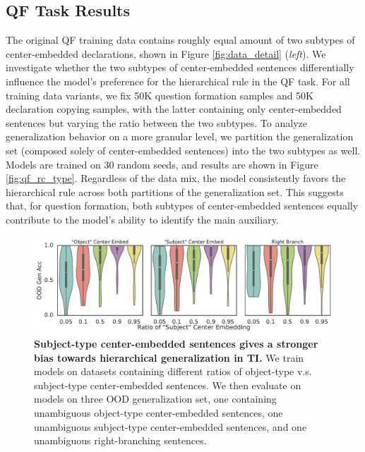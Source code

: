 \subsection{QF Task Results}
The original QF training data contains roughly equal amount of two subtypes of center-embedded declarations, shown in Figure \ref{fig:data_detail} (\textit{left}). We investigate whether the two subtypes of center-embedded sentences differentially influence the model's preference for the hierarchical rule in the QF task. For all training data variants, we fix 50K question formation samples and 50K declaration copying samples, with the latter containing only center-embedded sentences but varying the ratio between the two subtypes. To analyze generalization behavior on a more granular level, we partition the generalization set (composed solely of center-embedded sentences) into the two subtypes as well. Models are trained on 30 random seeds, and results are shown in Figure \ref{fig:qf_rc_type}. Regardless of the data mix, the model consistently favors the hierarchical rule across both partitions of the generalization set. This suggests that, for question formation, both subtypes of center-embedded sentences equally contribute to the model's ability to identify the main auxiliary.



\begin{figure}[h]
    \centering
    \includegraphics[width=0.9\linewidth]{figures/ti_rc_type.pdf}
    \caption{\textbf{Subject-type center-embedded sentences gives a stronger bias towards hierarchical generalization in TI.} We train models on datasets containing different ratios of object-type v.s. subject-type center-embedded sentences. We then evaluate on models on three OOD generalization set, one containing unambiguous object-type center-embedded sentences, one unambiguous subject-type center-embedded sentences, and one unambiguous right-branching sentences.}
    \label{fig:ti_rc_type}
\end{figure}

